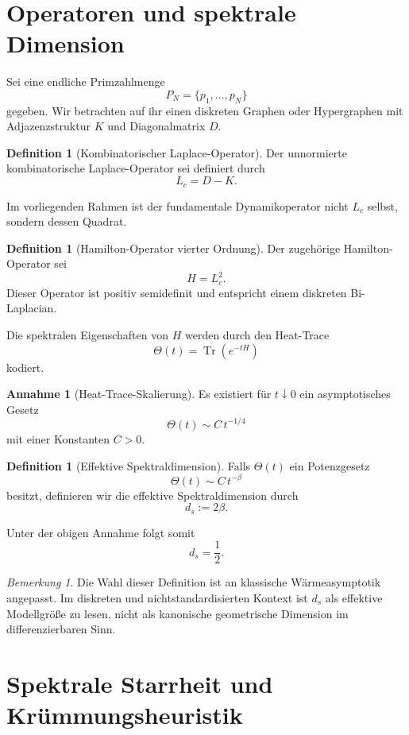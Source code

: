 \documentclass[11pt,a4paper]{article}
\theoremstyle{plain}
\theoremstyle{definition}
\newtheorem{definition}[satz]{Definition}
\newtheorem{annahme}[satz]{Annahme}
\theoremstyle{remark}
\newtheorem{bemerkung}[satz]{Bemerkung}
\newcommand{\Tr}{\operatorname{Tr}}
\newcommand{\ThetaH}{\Theta}
\begin{document}
	\section{Operatoren und spektrale Dimension}
	
	Sei eine endliche Primzahlmenge
	\[
	P_N=\{p_1,\dots,p_N\}
	\]
	gegeben. Wir betrachten auf ihr einen diskreten Graphen oder Hypergraphen mit Adjazenzstruktur $K$ und Diagonalmatrix $D$.
	
	\begin{definition}[Kombinatorischer Laplace-Operator]
		Der unnormierte kombinatorische Laplace-Operator sei definiert durch
		\[
		L_c=D-K.
		\]
	\end{definition}
	
	Im vorliegenden Rahmen ist der fundamentale Dynamikoperator nicht $L_c$ selbst, sondern dessen Quadrat.
	
	\begin{definition}[Hamilton-Operator vierter Ordnung]
		Der zugehörige Hamilton-Operator sei
		\[
		H=L_c^2.
		\]
		\]
		Dieser Operator ist positiv semidefinit und entspricht einem diskreten Bi-Laplacian.
	\end{definition}
	
	Die spektralen Eigenschaften von $H$ werden durch den Heat-Trace
	\[
	\ThetaH(t)=\Tr(e^{-tH})
	\]
	kodiert.
	
	\begin{annahme}[Heat-Trace-Skalierung]
		Es existiert für $t\downarrow 0$ ein asymptotisches Gesetz
		\[
		\ThetaH(t)\sim C\, t^{-1/4}
		\]
		mit einer Konstanten $C>0$.
	\end{annahme}
	
	\begin{definition}[Effektive Spektraldimension]
		Falls $\ThetaH(t)$ ein Potenzgesetz
		\[
		\ThetaH(t)\sim C\, t^{-\beta}
		\]
		besitzt, definieren wir die effektive Spektraldimension durch
		\[
		d_s:=2\beta.
		\]
	\end{definition}
	
	Unter der obigen Annahme folgt somit
	\[
	d_s=\frac12.
	\]
	
	\begin{bemerkung}
		Die Wahl dieser Definition ist an klassische Wärmeasymptotik angepasst. Im diskreten und nichtstandardisierten Kontext ist $d_s$ als effektive Modellgröße zu lesen, nicht als kanonische geometrische Dimension im differenzierbaren Sinn.
	\end{bemerkung}
	
	\section{Spektrale Starrheit und Krümmungsheuristik}
	
\end{document}

